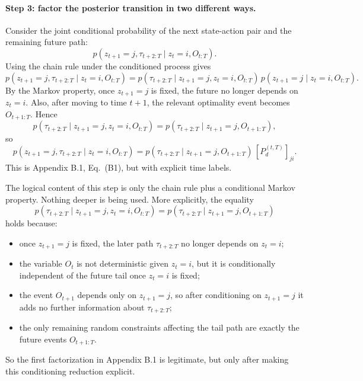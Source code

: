 \documentclass[11pt]{article}
\begin{document}
\paragraph{Step 3: factor the posterior transition in two different ways.}
Consider the joint conditional probability of the next state-action pair and the remaining
future path:
\begin{equation}
    p(z_{t+1}=j,\tau_{t+2:T}\mid z_t=i,O_{t:T}).
\end{equation}
Using the chain rule under the conditioned process gives
\begin{equation}
    p(z_{t+1}=j,\tau_{t+2:T}\mid z_t=i,O_{t:T})
    =
    p(\tau_{t+2:T}\mid z_{t+1}=j,z_t=i,O_{t:T})\,
    p(z_{t+1}=j\mid z_t=i,O_{t:T}).
\end{equation}
By the Markov property, once \(z_{t+1}=j\) is fixed, the future no longer depends on
\(z_t=i\). Also, after moving to time \(t+1\), the relevant optimality event becomes
\(O_{t+1:T}\). Hence
\begin{equation}
    p(\tau_{t+2:T}\mid z_{t+1}=j,z_t=i,O_{t:T})
    =
    p(\tau_{t+2:T}\mid z_{t+1}=j,O_{t+1:T}),
\end{equation}
so
\begin{equation}
    p(z_{t+1}=j,\tau_{t+2:T}\mid z_t=i,O_{t:T})
    =
    p(\tau_{t+2:T}\mid z_{t+1}=j,O_{t+1:T})\,[P_d^{(t,T)}]_{ji}.
    \label{eq:driven-factorization}
\end{equation}
This is Appendix B.1, Eq.~(B1), but with explicit time labels.

The logical content of this step is only the chain rule plus a conditional Markov property.
Nothing deeper is being used. More explicitly, the equality
\begin{equation}
    p(\tau_{t+2:T}\mid z_{t+1}=j,z_t=i,O_{t:T})
    =
    p(\tau_{t+2:T}\mid z_{t+1}=j,O_{t+1:T})
\end{equation}
holds because:
\begin{itemize}
    \item once \(z_{t+1}=j\) is fixed, the later path \(\tau_{t+2:T}\) no longer depends on
    \(z_t=i\);
    \item the variable \(O_t\) is not deterministic given \(z_t=i\), but it is conditionally
    independent of the future tail once \(z_t=i\) is fixed;
    \item the event \(O_{t+1}\) depends only on \(z_{t+1}=j\), so after conditioning on
    \(z_{t+1}=j\) it adds no further information about \(\tau_{t+2:T}\);
    \item the only remaining random constraints affecting the tail path are exactly the future
    events \(O_{t+1:T}\).
\end{itemize}
So the first factorization in Appendix B.1 is legitimate, but only after making this
conditioning reduction explicit.
\end{document}
